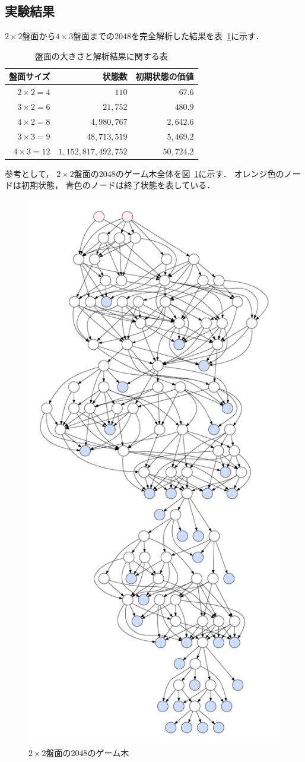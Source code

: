 \subsection{実験結果}
$2\times2$盤面から$4\times3$盤面までの2048を完全解析した結果を表~\ref{table: analysis_table}に示す．
\begin{table}[t]
    \centering
    \begin{tabular}{rrr}
        \hline \hline
        盤面サイズ & 状態数 & 初期状態の価値\\ \hline
        $2\times2=4$ & $110$ & $67.6$ \\
        $3\times2=6$ & $21,752$ & $480.9$ \\
        $4\times2=8$ & $4,980,767$ & $2,642.6$ \\
        $3\times3=9$ & $48,713,519$ & $5,469.2$ \\
        $4\times3=12$ & $1,152,817,492,752$ & $50,724.2$ \\
        \hline
    \end{tabular}
    \caption{盤面の大きさと解析結果に関する表}
    \label{table: analysis_table}
\end{table}

参考として， $2\times2$盤面の2048のゲーム木全体を図~\ref{fig:game_tree}に示す．
オレンジ色のノードは初期状態， 青色のノードは終了状態を表している．
\begin{figure}[t]
    \centering
    \includegraphics[width=0.7\linewidth{}]{figures/tree.pdf}
    \caption{$2\times2$盤面の2048のゲーム木}
    \label{fig:game_tree}
\end{figure}
